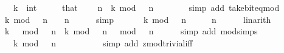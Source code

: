 \begin{isabellebody}
\ \ \ k\ {\isacharcolon}{\kern0pt}{\isacharcolon}{\kern0pt}\ int\isanewline
%
\isadelimproof
%
\endisadelimproof
%
\isatagproof
{}\isamarkupfalse%
\ {\isacharminus}{\kern0pt}\isanewline
\ \ \isamarkupfalse%
\ that\ \isamarkupfalse%
\ {\isacartoucheopen}{}\ {\isacharcircum}{\kern0pt}\ n\ {\isasymnoteq}\ k\ mod\ {}\ {\isacharcircum}{\kern0pt}\ n\ {\isacharplus}{\kern0pt}\ {}{\isacartoucheclose}\isanewline
\ \ \ \ \isamarkupfalse%
\ {\isacharparenleft}{\kern0pt}simp\ add{\isacharcolon}{\kern0pt}\ take{\isacharunderscore}{\kern0pt}bit{\isacharunderscore}{\kern0pt}eq{\isacharunderscore}{\kern0pt}mod{\isacharparenright}{\kern0pt}\isanewline
\ \ \isamarkupfalse%
\ \isamarkupfalse%
\ {\isacartoucheopen}k\ mod\ {}\ {\isacharcircum}{\kern0pt}\ n\ {\isacharless}{\kern0pt}\ {}\ {\isacharcircum}{\kern0pt}\ n{\isacartoucheclose}\isanewline
\ \ \ \ \isamarkupfalse%
\ simp\isanewline
\ \ \isamarkupfalse%
\ \isamarkupfalse%
\ {\isacharasterisk}{\kern0pt}{\isacharcolon}{\kern0pt}\ {\isacartoucheopen}k\ mod\ {}\ {\isacharcircum}{\kern0pt}\ n\ {\isacharplus}{\kern0pt}\ {}\ {\isacharless}{\kern0pt}\ {}\ {\isacharcircum}{\kern0pt}\ n{\isacartoucheclose}\isanewline
\ \ \ \ \isamarkupfalse%
\ linarith\isanewline
\ \ \isamarkupfalse%
\ {\isacartoucheopen}{\isacharparenleft}{\kern0pt}k\ {\isacharplus}{\kern0pt}\ {}{\isacharparenright}{\kern0pt}\ mod\ {}\ {\isacharcircum}{\kern0pt}\ n\ {\isacharequal}{\kern0pt}\ {\isacharparenleft}{\kern0pt}k\ mod\ {}\ {\isacharcircum}{\kern0pt}\ n\ {\isacharplus}{\kern0pt}\ {}{\isacharparenright}{\kern0pt}\ mod\ {}\ {\isacharcircum}{\kern0pt}\ n{\isacartoucheclose}\isanewline
\ \ \ \ \isamarkupfalse%
\ {\isacharparenleft}{\kern0pt}simp\ add{\isacharcolon}{\kern0pt}\ mod{\isacharunderscore}{\kern0pt}simps{\isacharparenright}{\kern0pt}\isanewline
\ \ \isamarkupfalse%
\ \isamarkupfalse%
\ {\isacartoucheopen}{\isasymdots}\ {\isacharequal}{\kern0pt}\ k\ mod\ {}\ {\isacharcircum}{\kern0pt}\ n\ {\isacharplus}{\kern0pt}\ {}{\isacartoucheclose}\isanewline
\ \ \ \ \isamarkupfalse%
\ {\isacharasterisk}{\kern0pt}\ \isamarkupfalse%
\ {\isacharparenleft}{\kern0pt}simp\ add{\isacharcolon}{\kern0pt}\ zmod{\isacharunderscore}{\kern0pt}trivial{\isacharunderscore}{\kern0pt}iff{\isacharparenright}{\kern0pt}\isanewline

\end{isabellebody}
